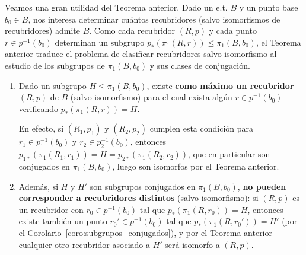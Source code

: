 Veamos una gran utilidad del Teorema anterior. Dado un e.t. $B$ y un punto base $b_0 \in B$, nos interesa determinar cuántos recubridores (salvo isomorfismos de recubridores) admite $B$. Como cada recubridor $(R,p)$ y cada punto $r \in p^{-1}(b_0)$ determinan un subgrupo $p_*(\pi_1(R,r)) \le \pi_1(B,b_0)$, el Teorema anterior traduce el problema de clasificar recubridores salvo isomorfismo al estudio de los subgrupos de $\pi_1(B,b_0)$ y sus clases de conjugación.
\begin{enumerate}
    \item Dado un subgrupo $H \le \pi_1(B,b_0)$, existe \textbf{como máximo un recubridor} $(R,p)$ de $B$ (salvo isomorfismo) para el cual exista algún $r \in p^{-1}(b_0)$ verificando $p_*(\pi_1(R,r)) = H$.
    \begin{center}
    \end{center}
    
    En efecto, si $(R_1,p_1)$ y $(R_2,p_2)$ cumplen esta condición para $r_1 \in p_1^{-1}(b_0)$ y $r_2 \in p_2^{-1}(b_0)$, entonces $p_{1*}(\pi_1(R_1,r_1)) = H = p_{2*}(\pi_1(R_2,r_2))$, que en particular son conjugados en $\pi_1(B,b_0)$, luego son isomorfos por el Teorema anterior.
    
    \item Además, si $H$ y $H'$ son subgrupos conjugados en $\pi_1(B,b_0)$, \textbf{no pueden corresponder a recubridores distintos} (salvo isomorfismo): si $(R,p)$ es un recubridor con $r_0 \in p^{-1}(b_0)$ tal que $p_*(\pi_1(R,r_0)) = H$, entonces existe también un punto $r_0' \in p^{-1}(b_0)$ tal que $p_*(\pi_1(R,r_0')) = H'$ (por el Corolario~\ref{coro:subgrupos_conjugados}), y por el Teorema anterior cualquier otro recubridor asociado a $H'$ será isomorfo a $(R,p)$.
    \begin{center}
    \end{center}


\end{enumerate}

